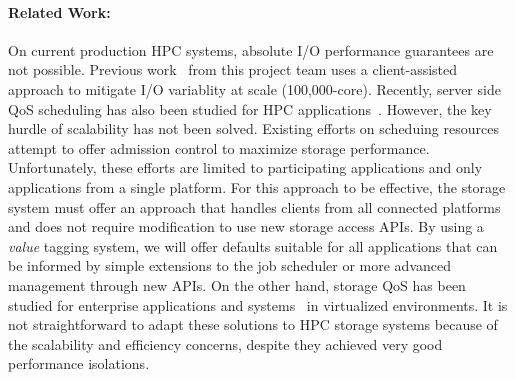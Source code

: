 

\paragraph{Related Work:}
On current production HPC systems, absolute I/O performance guarantees are not
possible. Previous work~\cite{lofstead:2010:io-variability,liu_hotstorage} from
this project team uses a client-assisted approach to mitigate I/O variablity at
scale (100,000-core).  Recently, server side QoS scheduling has also been
studied for HPC applications~\cite{Dai:2014}.  However, the key hurdle of
scalability has not been solved.  Existing efforts on scheduing
resources~\cite{thapaliya:2014:io-cop,dorier:2014:calciom} attempt to offer
admission control to maximize storage performance. Unfortunately, these efforts
are limited to participating applications and only applications from a single
platform. For this approach to be effective, the storage system must offer an
approach that handles clients from all connected platforms and does not require
modification to use new storage access APIs. By using a {\it value} tagging
system, we will offer defaults suitable for all applications that can be
informed by simple extensions to the job scheduler or more advanced management
through new APIs. On the other hand, storage QoS has been studied for
enterprise applications and systems~\cite{Gulati:2007,Gulati:2010,Gulati:2012}
in virtualized environments. It is not straightforward to adapt these solutions
to HPC storage systems because of the scalability and efficiency concerns,
despite they achieved very good performance isolations.

